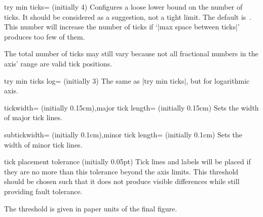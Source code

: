 \begin{pgfplotskey}{try min ticks= (initially 4)}
	Configures a loose lower bound on the number of ticks. It should be considered as a suggestion, not a tight limit. The default is~\axisdefaulttryminticks. This number will increase the number of ticks if `|max space between ticks|' produces too few of them.

	The total number of ticks may still vary because not all fractional numbers in the axis' range are valid tick positions.
\end{pgfplotskey}

\begin{pgfplotskey}{try min ticks log= (initially 3)}
	The same as |try min ticks|, but for logarithmic axis.
\end{pgfplotskey}

\begin{pgfplotskeylist}{tickwidth= (initially 0.15cm),major tick length= (initially 0.15cm)}
	Sets the width of major tick lines.
\end{pgfplotskeylist}

\begin{pgfplotskeylist}{subtickwidth= (initially 0.1cm),minor tick length= (initially 0.1cm)}
	Sets the width of minor tick lines.
\end{pgfplotskeylist}

\begin{pgfplotsxykeylist}{\x tick placement tolerance (initially 0.05pt)}
	Tick lines and labels will be placed if they are no more than this tolerance beyond the axis limits. This threshold should be chosen such that it does not produce visible differences while still providing fault tolerance.

	The threshold is given in paper units of the final figure.
\end{pgfplotsxykeylist}

